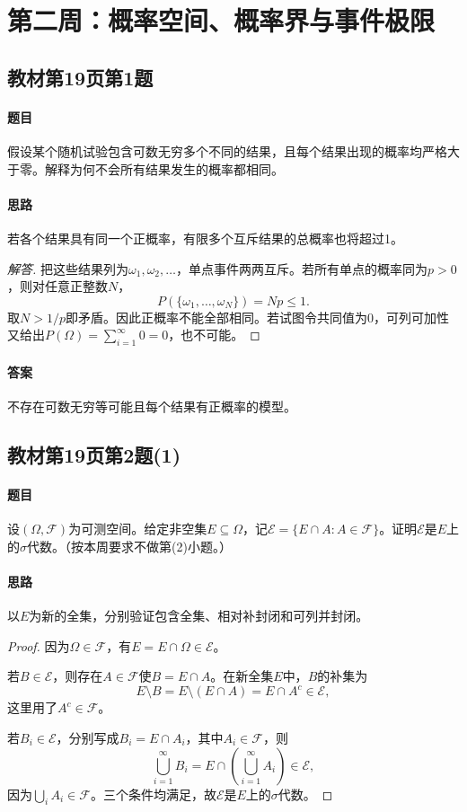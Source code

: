 \clearpage\section{第二周：概率空间、概率界与事件极限}
\subsection{教材第19页第1题}\label{ex:w02-t1}
\paragraph{题目}
假设某个随机试验包含可数无穷多个不同的结果，且每个结果出现的概率均严格大于零。解释为何不会所有结果发生的概率都相同。
\paragraph{思路}若各个结果具有同一个正概率，有限多个互斥结果的总概率也将超过1。
\begin{proof}[解答]
把这些结果列为$\omega_1,\omega_2,\ldots$，单点事件两两互斥。若所有单点的概率同为$p>0$，则对任意正整数$N$，
\[P(\{\omega_1,\ldots,\omega_N\})=Np\leq1.\]
取$N>1/p$即矛盾。因此正概率不能全部相同。若试图令共同值为0，可列可加性又给出$P(\Omega)=\sum_{i=1}^\infty0=0$，也不可能。
\end{proof}
\paragraph{答案}不存在可数无穷等可能且每个结果有正概率的模型。

\subsection{教材第19页第2题(1)}\label{ex:w02-t2}
\paragraph{题目}
设$(\Omega,\mathscr F)$为可测空间。给定非空集$E\subseteq\Omega$，记$\mathscr E=\{E\cap A:A\in\mathscr F\}$。证明$\mathscr E$是$E$上的$\sigma$代数。（按本周要求不做第(2)小题。）
\paragraph{思路}以$E$为新的全集，分别验证包含全集、相对补封闭和可列并封闭。
\begin{proof}
因为$\Omega\in\mathscr F$，有$E=E\cap\Omega\in\mathscr E$。

若$B\in\mathscr E$，则存在$A\in\mathscr F$使$B=E\cap A$。在新全集$E$中，$B$的补集为
\[E\setminus B=E\setminus(E\cap A)=E\cap A^c\in\mathscr E,\]
这里用了$A^c\in\mathscr F$。

若$B_i\in\mathscr E$，分别写成$B_i=E\cap A_i$，其中$A_i\in\mathscr F$，则
\[\bigcup_{i=1}^{\infty}B_i=E\cap\left(\bigcup_{i=1}^{\infty}A_i\right)\in\mathscr E,\]
因为$\bigcup_iA_i\in\mathscr F$。三个条件均满足，故$\mathscr E$是$E$上的$\sigma$代数。
\end{proof}
